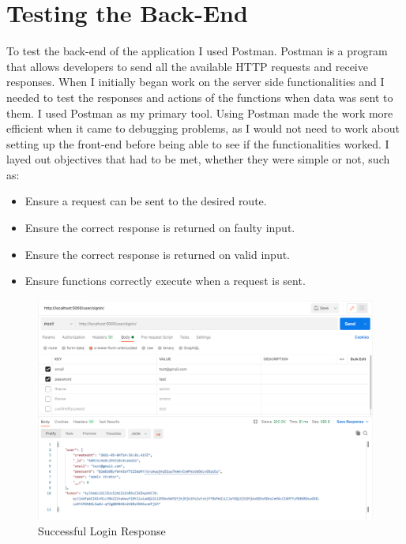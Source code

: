 \section{Testing the Back-End}
To test the back-end of the application I used Postman. Postman is a program that allows developers to send all the available HTTP requests and receive responses. When I initially began work on the server side functionalities and I needed to test the responses and actions of the functions when data was sent to them. I used Postman as my primary tool. Using Postman made the work more efficient when it came to debugging problems, as I would not need to work about setting up the front-end before being able to see if the functionalities worked. I layed out objectives that had to be met, whether they were simple or not, such as:
\begin{itemize}
    \item Ensure a request can be sent to the desired route.
    \item Ensure the correct response is returned on faulty input.
    \item Ensure the correct response is returned on valid input.
    \item Ensure functions correctly execute when a request is sent.
\end{itemize}

\begin{figure}
    \centering
    \includegraphics[scale=0.5]{img/Postman/login-success.png}
    \caption{Successful Login Response}
    \label{fig9.1:loginsuccess}
\end{figure}

